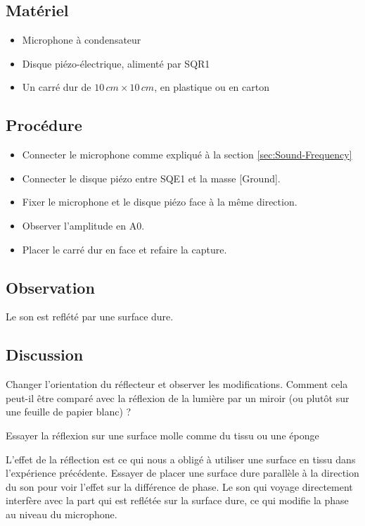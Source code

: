 \documentclass{book}
\begin{document}
\subsection{Matériel}


\begin{itemize}
  \item Microphone à condensateur
  \item Disque piézo-électrique, alimenté par SQR1
  \item Un carré dur de $10\, cm\times10\, cm$, en plastique ou en carton
\end{itemize}

\subsection{Procédure}


\begin{itemize}
  \item Connecter le microphone comme expliqué à la section  \ref{sec:Sound-Frequency}
  \item Connecter le disque piézo entre SQE1 et la masse [Ground].
  \item Fixer le microphone et le disque piézo face à la même direction.
  \item Observer l'amplitude en A0.
  \item Placer le carré dur en face et refaire la capture.
\end{itemize}

\subsection{Observation}


Le son est reflété par une surface dure.

\subsection{Discussion}


Changer l'orientation du réflecteur et observer les modifications. Comment cela peut-il être comparé avec la réflexion de la lumière par un miroir (ou plutôt sur une feuille de papier blanc) ?



Essayer la réflexion sur une surface molle comme du tissu ou une éponge



L'effet de la réflection est ce qui nous a obligé à utiliser une surface en tissu dans l'expérience précédente. Essayer de placer une surface dure parallèle à la direction du son pour voir l'effet sur la différence de phase. Le son qui voyage directement interfère avec la part qui est reflétée sur la surface dure, ce qui modifie la phase au niveau du microphone.
\end{document}
